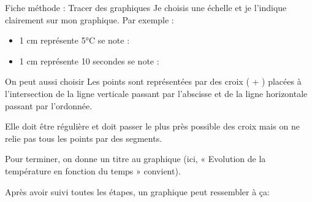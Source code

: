 \documentclass[10pt]{article}
\newcommand{\titre}{Fiche méthode : Tracer des graphiques} %
\begin{document}
\begin{titlebox}{\titre}
    Je choisis une échelle et je l’indique clairement sur mon graphique. Par exemple :
    \begin{itemize}
        \item 1 cm représente 5°C se note : 
        \item 1 cm représente 10 secondes se note : 
    \end{itemize}

    On peut aussi choisir 
    Les points sont représentées par des croix ( + ) placées à l’intersection de la ligne verticale passant par l’abscisse et de la ligne
    horizontale passant par l’ordonnée.

    Elle doit être régulière et doit passer le plus près possible des croix mais on ne relie pas tous les points par des segments.

    \begin{center}        
    \begin{minipage}[c]{0.25\textwidth}
        Pour terminer, on donne un titre au graphique 
        (ici, « Evolution de la température en fonction du temps »
        convient).

        Après avoir suivi toutes les étapes, un graphique peut
        ressembler à ça:
    \end{minipage}
    \hspace{10pt}
    \begin{minipage}[c]{0.7\textwidth}
        \centering
    \end{minipage}
    \end{center}
    
\end{titlebox}
\end{document}
